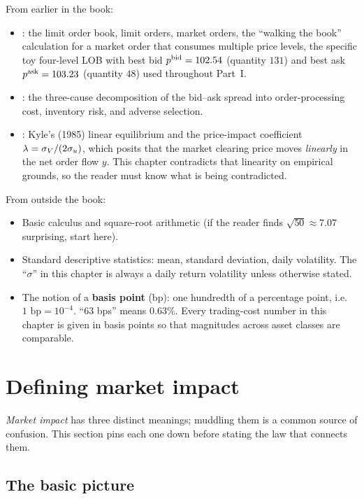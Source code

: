 \begin{backgroundbox}[Prerequisites]
From earlier in the book:
\begin{itemize}
  \item {}: the limit order book, limit orders, market
  orders, the ``walking the book'' calculation for a market order
  that consumes multiple price levels, the specific toy four-level
  LOB with best bid $p^{\mathrm{bid}} = 102.54$ (quantity $131$) and best ask
  $p^{\mathrm{ask}} = 103.23$ (quantity $48$) used throughout Part~I.
  \item {}: the three-cause decomposition of
  the bid--ask spread into order-processing cost, inventory risk,
  and adverse selection.
  \item {}: Kyle's (1985) linear equilibrium and the
  price-impact coefficient $\lambda = \sigma_V / (2\sigma_u)$, which
  posits that the market clearing price moves \emph{linearly} in
  the net order flow $y$. This chapter contradicts that linearity
  on empirical grounds, so the reader must know what is being
  contradicted.
\end{itemize}
From outside the book:
\begin{itemize}
  \item Basic calculus and square-root arithmetic (if the reader
  finds $\sqrt{50} \approx 7.07$ surprising, start here).
  \item Standard descriptive statistics: mean, standard
  deviation, daily volatility. The ``$\sigma$'' in this chapter is
  always a daily return volatility unless otherwise stated.
  \item The notion of a \textbf{basis point} (bp): one hundredth of
  a percentage point, i.e.\ $1 \text{ bp} = 10^{-4}$. ``$63$ bps''
  means $0.63\%$. Every trading-cost number in this chapter is
  given in basis points so that magnitudes across asset classes
  are comparable.
\end{itemize}
\end{backgroundbox}

\section{Defining market impact}
\label{sec:defining_impact}

\emph{Market impact} has three distinct meanings; muddling them is a
common source of confusion. This section pins each one down before
stating the law that connects them.

\subsection{The basic picture}
\label{subsec:basic_picture}

